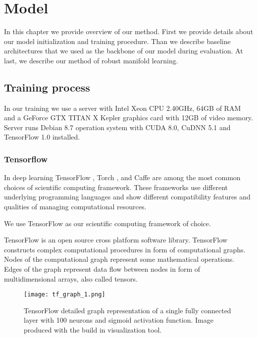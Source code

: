 
\chapter{Model}

In this chapter we provide overview of our method.
First we provide details about our model initialization and training procedure.
Than we describe baseline architectures that we used as the backbone of our model during evaluation.
At last, we describe our method of robust manifold learning.


\label{ch:mode}

\section{Training process}

In our training we use a server with Intel Xeon CPU 2.40GHz, 64GB of RAM and a GeForce GTX TITAN X Kepler graphics card with 12GB of video memory. Server runs Debian 8.7 operation system with CUDA 8.0, CuDNN 5.1 and TensorFlow 1.0 installed.

\subsection{Tensorflow}

In deep learning TensorFlow \cite{GoogleResearch2015, Abadi2016}, Torch \cite{torch}, and Caffe \cite{jia2014caffe} are among the most common choices of scientific computing framework.
These frameworks use different underlying programming languages and show different compatibility features and qualities of managing computational resources.

We use TensorFlow as our scientific computing framework of choice.

TensorFlow is an open source cross platform software library.
TensorFlow constructs complex computational procedures in form of computational graphs.
Nodes of the computational graph represent some mathematical operations.
Edges of the graph represent data flow between nodes in form of multidimensional arrays, also called tensors.

\begin{figure}[h!]
  \centering
    \texttt{[image: tf\_graph\_1.png]}
  \caption{TensorFlow detailed graph representation of a single fully connected layer with 100 neurons and sigmoid activation function. Image produced with the build in visualization tool.}
  \label{fig:tf_graph}
\end{figure}

